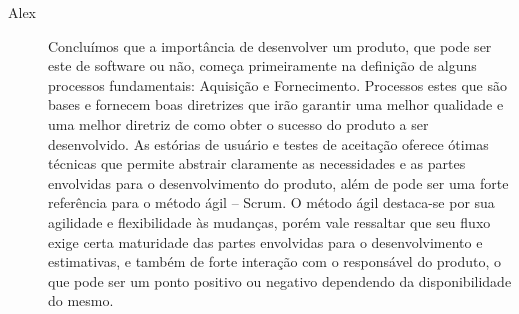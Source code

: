 \begin{description}
\item [Alex] Concluímos que a importância de desenvolver um produto, que pode ser este de software ou não, começa primeiramente na definição de alguns processos fundamentais: Aquisição e Fornecimento. Processos estes que são bases e fornecem boas diretrizes que irão garantir uma melhor qualidade e uma melhor diretriz de como obter o sucesso do produto a ser desenvolvido. As estórias de usuário e testes de aceitação oferece ótimas técnicas que permite abstrair claramente as necessidades e as partes envolvidas para o desenvolvimento do produto, além de pode ser uma forte referência para o método ágil – Scrum. O método ágil destaca-se por sua agilidade e flexibilidade às mudanças, porém vale ressaltar que seu fluxo exige certa maturidade das partes envolvidas para o desenvolvimento e estimativas, e também de forte interação com o responsável do produto, o que pode ser um ponto positivo ou negativo dependendo da disponibilidade do mesmo.
\end{description}

